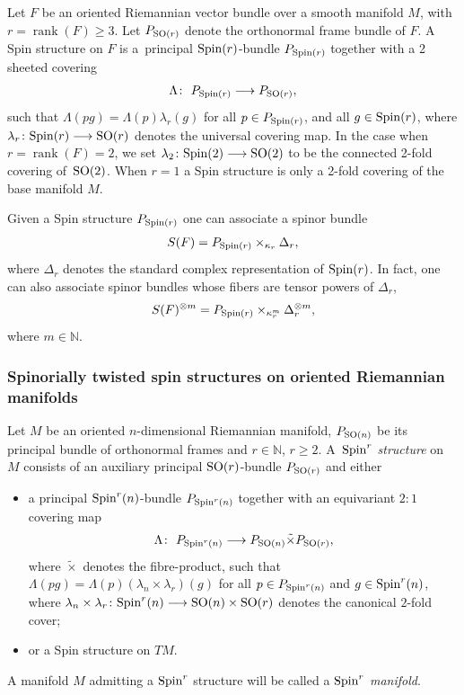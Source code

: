 \documentclass[10pt,a4paper]{amsart}
\newcommand{\lra}{\longrightarrow}
\numberwithin{equation}{section}
\begin{document}
Let $F$ be an oriented Riemannian vector bundle over a smooth manifold $M$, with \mbox{$r\!=\!\operatorname{rank}(F)\!\geq\! 3$}. Let $P_{{\rm SO}(r)}$ denote the orthonormal frame bundle of $F$. A Spin structure on $F$ is a~principal ${\rm Spin}(r)$-bundle $P_{{\rm Spin}(r)}$ together with a 2 sheeted covering
\begin{gather*} \Lambda\colon \ P_{{\rm Spin}(r)}\lra P_{{\rm SO}(r)},\end{gather*}
such that $\Lambda(pg)=\Lambda(p)\lambda_r(g)$ for all $p\in P_{{\rm Spin}(r)}$, and all $g\in {\rm Spin}(r)$, where $\lambda_r\colon {\rm Spin}(r)\lra {\rm SO}(r)$ denotes the universal covering map. In the case when $r=\operatorname{rank}(F)=2$, we set $\lambda_2\colon {\rm Spin}(2)\lra {\rm SO}(2)$ to be the connected 2-fold covering of~${\rm SO}(2)$. When $r=1$ a Spin structure is only a 2-fold covering of the base manifold $M$.

Given a Spin structure $P_{{\rm Spin}(r)}$ one can associate a spinor bundle
\begin{gather*} S(F) = P_{{\rm Spin}(r)}\times_{\kappa_r} \Delta_r,\end{gather*}
where $\Delta_r$ denotes the standard complex representation of ${\rm Spin}(r)$. In fact, one can also associate spinor bundles whose fibers are tensor powers of $\Delta_r$,
\begin{gather*} S(F)^{\otimes m}=P_{{\rm Spin}(r)}\times_{\kappa_r^m} \Delta_r^{\otimes m},\end{gather*}
where $m\in\mathbb{N}$.

\subsubsection{Spinorially twisted spin structures on oriented Riemannian manifolds}

\begin{Definition}Let $M$ be an oriented $n$-dimensional Riemannian manifold, $P_{{\rm SO}(n)}$ be its principal bundle of orthonormal frames and $r\in\mathbb{N}$, $r\geq 2$. A~{\em ${\rm Spin}^r$ structure} on $M$ consists of an auxiliary principal ${\rm SO}(r)$-bundle $P_{{\rm SO}(r)}$ and either
\begin{itemize}\itemsep=0pt
\item a principal ${\rm Spin}^r(n)$-bundle $P_{{\rm Spin}^{r}(n)}$ together with an equivariant $2:1$ covering map
\begin{gather*} \Lambda\colon \ P_{{\rm Spin}^{r}(n)}\lra P_{{\rm SO}(n)} \tilde{\times} P_{{\rm SO}(r)},\end{gather*}
where $\tilde{\times}$ denotes the fibre-product, such that $\Lambda(pg)=\Lambda(p)(\lambda_n\times\lambda_r)(g)$ for all $p\in P_{{\rm Spin}^{r}(n)}$ and
$g\in {\rm Spin}^{r}(n)$, where $\lambda_n\times\lambda_r\colon {\rm Spin}^r(n)\lra {\rm SO}(n)\times {\rm SO}(r)$ denotes the canonical $2$-fold cover;
\item or a Spin structure on $TM$.
\end{itemize}

A manifold $M$ admitting a ${\rm Spin}^r$ structure will be called a {\em ${\rm Spin}^r$ manifold}.
\end{Definition}
\end{document}
